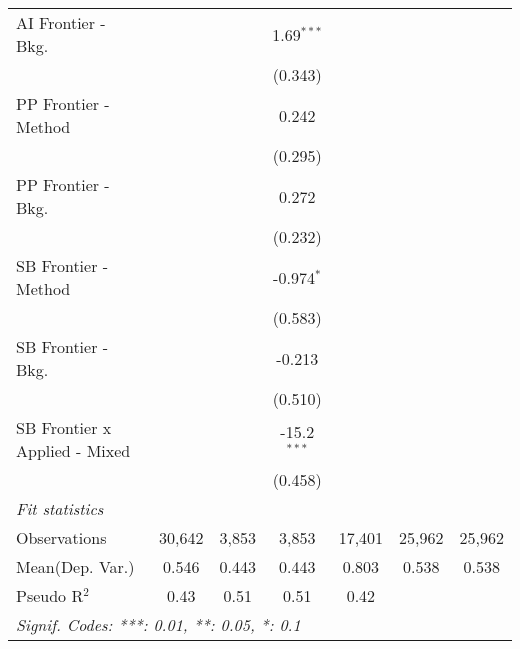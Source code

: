 \begin{tabular}{lcccccc}
   AI Frontier - Bkg.            &               &              & 1.69$^{***}$  &               &        &   \\   
                                 &               &              & (0.343)       &               &        &   \\   
   PP Frontier - Method          &               &              & 0.242         &               &        &   \\   
                                 &               &              & (0.295)       &               &        &   \\   
   PP Frontier - Bkg.            &               &              & 0.272         &               &        &   \\   
                                 &               &              & (0.232)       &               &        &   \\   
   SB Frontier - Method          &               &              & -0.974$^{*}$  &               &        &   \\   
                                 &               &              & (0.583)       &               &        &   \\   
   SB Frontier - Bkg.            &               &              & -0.213        &               &        &   \\   
                                 &               &              & (0.510)       &               &        &   \\   
   SB Frontier x Applied - Mixed &               &              & -15.2$^{***}$ &               &        &   \\   
                                 &               &              & (0.458)       &               &        &   \\   
   \midrule
   \emph{Fit statistics}\\
   Observations                  & 30,642        & 3,853        & 3,853         & 17,401        & 25,962 & 25,962\\  
Mean(Dep. Var.) & 0.546 & 0.443 & 0.443 & 0.803 & 0.538 & 0.538 \\
   Pseudo R$^2$                  & 0.43          & 0.51         & 0.51          & 0.42          &        & \\  
   \midrule \midrule
   \multicolumn{7}{l}{\emph{Signif. Codes: ***: 0.01, **: 0.05, *: 0.1}}\\
\end{tabular}
\par\endgroup
